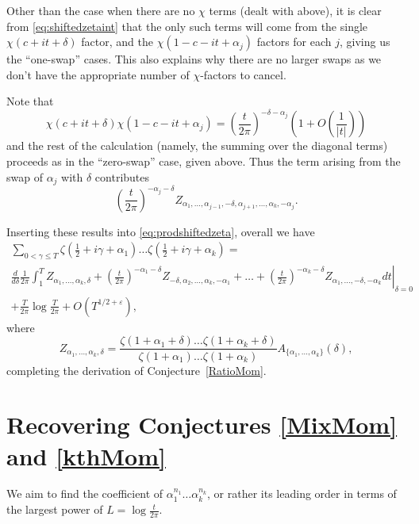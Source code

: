 \documentclass[12pt,a4paper,reqno]{amsart}
\theoremstyle{remark}
\numberwithin{equation}{section}
\begin{document}
Other than the case when there are no $\chi$ terms (dealt with above), it is clear from \eqref{eq:shiftedzetaint} that the only such terms will come from the single $\chi(c+it+\delta)$ factor, and the $\chi(1-c-it+\alpha_j)$ factors for each $j$, giving us the ``one-swap'' cases. This also explains why there are no larger swaps as we don't have the appropriate number of $\chi$-factors to cancel.

Note that
\[
\chi (c+it+\delta) \chi (1-c-it+\alpha_j) = \left( \frac{t}{ 2\pi} \right)^{-\delta - \alpha_j} \left( 1 + O \left(\frac{1}{|t|} \right) \right)
\]
and the rest of the calculation (namely, the summing over the diagonal terms) proceeds as in the ``zero-swap'' case, given above. Thus the term arising from the swap of $\alpha_j$ with $\delta$ contributes
\[
\left( \frac{t}{2 \pi} \right)^{-\alpha_j - \delta} Z_{ \alpha_1,\dots, \alpha_{j-1}, -\delta, \alpha_{j+1},\dots,\alpha_k,-\alpha_j} .
\]


Inserting these results into \eqref{eq:prodshiftedzeta}, overall we have
\begin{multline*}
\sum_{0 < \gamma \leq T}  \zeta \left( \frac{1}{2} + i \gamma + \alpha_1 \right)\dots\zeta \left( \frac{1}{2} + i \gamma + \alpha_k \right) = \\
 \left. \frac{d}{d \delta} \frac{1}{2 \pi} \int_{1}^{T} Z_{\alpha_1,\dots,\alpha_k,\delta} + \left( \frac{t}{2 \pi} \right)^{-\alpha_1 - \delta} Z_{-\delta, \alpha_2,\dots,\alpha_k,-\alpha_1} +\dots + \left( \frac{t}{2 \pi} \right)^{-\alpha_k - \delta} Z_{ \alpha_1,\dots,-\delta, -\alpha_k} dt  \right|_{\delta=0} \\
+\frac{T}{2\pi}\log\frac{T}{2\pi} + O\left(T^{1/2 +\varepsilon}\right),
\end{multline*}
where
\[
 Z_{\alpha_1,\dots,\alpha_k,\delta} = \frac{  \zeta (1+\alpha_1 + \delta)  \dots \zeta (1+\alpha_k +\delta)}{\zeta (1+\alpha_1)  \dots \zeta (1+\alpha_k)} A_{\{\alpha_1,\dots,\alpha_k\}}(\delta),
\]
completing the derivation of Conjecture~\ref{RatioMom}.



\section{Recovering Conjectures \ref{MixMom} and \ref{kthMom}}\label{LeadingOrder}
We aim to find the coefficient of $\alpha_1^{n_1} \dots \alpha_k^{n_k}$, or rather its leading order in terms of the largest power of $L = \log\frac{t}{2\pi}$.
\end{document}
